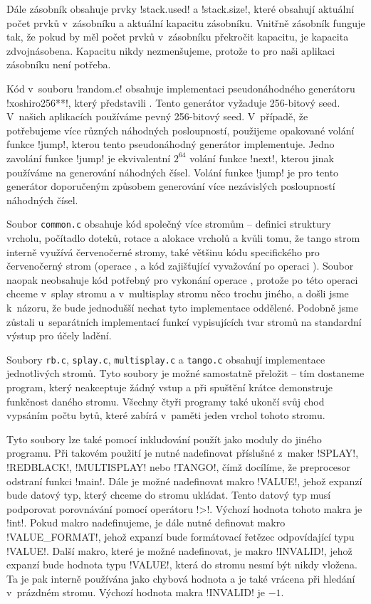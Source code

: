 Dále zásobník obsahuje prvky !stack.used! a !stack.size!, které obsahují
aktuální počet prvků v~zásobníku a aktuální kapacitu zásobníku. Vnitřně
zásobník funguje tak, že pokud by měl počet prvků v~zásobníku překročit
kapacitu, je kapacita zdvojnásobena. Kapacitu nikdy nezmenšujeme, protože to
pro naši aplikaci zásobníku není potřeba.

Kód v~souboru !random.c! obsahuje implementaci pseudonáhodného generátoru
!xoshiro256**!, který představili \citet{xoshiro}. Tento generátor vyžaduje 256-bitový seed. V~našich aplikacích
používáme pevný 256-bitový seed. V~případě, že potřebujeme více různých
náhodných posloupností, použijeme opakované volání funkce !jump!, kterou tento
pseudonáhodný generátor implementuje. Jedno zavolání funkce !jump! je
ekvivalentní $2^{64}$ volání funkce !next!, kterou jinak používáme na generování náhodných čísel. Volání funkce !jump! je pro tento
generátor doporučeným způsobem generování více nezávislých posloupností náhodných
čísel.

Soubor {\tt common.c} obsahuje kód společný více
stromům -- definici struktury vrcholu, počítadlo doteků, rotace a alokace vrcholů a kvůli
tomu, že tango strom interně využívá červenočerné stromy, také většinu kódu
specifického pro červenočerný strom (operace ,  a kód
zajišťující vyvažování po operaci ). Soubor naopak neobsahuje kód
potřebný pro vykonání operace , protože po této operaci chceme
v~splay stromu a v~multisplay stromu něco trochu jiného, a došli jsme k~názoru, že
bude jednodušší nechat tyto implementace oddělené. Podobně jsme zůstali
u~separátních implementací funkcí vypisujících tvar stromů na standardní výstup pro
účely ladění.

Soubory {\tt rb.c}, {\tt splay.c}, {\tt multisplay.c} a {\tt tango.c} obsahují
implementace jednotlivých stromů. Tyto soubory je možné samostatně přeložit --
tím dostaneme program, který neakceptuje žádný vstup a při spuštění krátce
demonstruje funkčnost daného stromu. Všechny čtyři programy také ukončí svůj
chod vypsáním počtu bytů, které zabírá v~paměti jeden vrchol tohoto stromu.

Tyto soubory lze také pomocí inkludování použít jako moduly do jiného programu. Při takovém použití je nutné nadefinovat příslušné z~maker
!SPLAY!, !REDBLACK!, !MULTISPLAY! nebo !TANGO!, čímž docílíme, že preprocesor
odstraní funkci !main!. Dále je možné nadefinovat makro !VALUE!, jehož expanzí
bude datový typ, který chceme do stromu ukládat. Tento datový typ musí
podporovat porovnávání pomocí operátoru !>!. Výchozí hodnota tohoto makra je
!int!. Pokud makro nadefinujeme, je dále nutné definovat makro
!VALUE_FORMAT!, jehož expanzí bude formátovací řetězec odpovídající typu
!VALUE!. Další makro, které je možné nadefinovat, je makro !INVALID!, jehož expanzí bude hodnota
typu !VALUE!, která do stromu nesmí být nikdy vložena. Ta je pak interně
používána jako chybová hodnota a je také vrácena při hledání v~prázdném stromu. Výchozí hodnota makra !INVALID! je $-1$.

